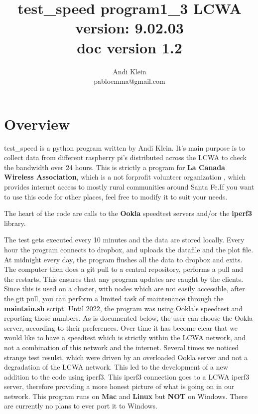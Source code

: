 \documentclass[11pt]{article}
\begin{document}
\author{ Andi Klein \\ pabloemma@gmail.com}
\title{ test\_speed program1\_3 LCWA \\ 
		\bf{version: 9.02.03} \\
		doc version 1.2}
\maketitle
\setcounter{secnumdepth}{10}
\setcounter{tocdepth}{10}

\tableofcontents
\newpage

\newenvironment{andilist}{\begin{itemize} \em}{\end{itemize}}



\section{Overview}
test\_speed is a python program written by Andi Klein. It's main purpose is to collect data from different raspberry pi's distributed across the LCWA to check the bandwidth over 24 hours. This is strictly a program for \textbf{La Canada Wireless Association}, which is a not forprofit volunteer organization , which provides internet access to mostly rural communities around Santa Fe.If you want to use this code for other places, feel free to modify it to suit your needs.

The heart of the code are calls to the \textbf{Ookla} speedtest servers and/or the \textbf{iperf3} library. 

The test gets executed every 10 minutes and the data are stored locally. Every hour the program connects to dropbox, and uploads the datafile and the plot file. At midnight every day, the program flushes all the data to dropbox and exits. The computer then does a git pull to a central repository, performs a pull and the restarts. This ensures that any program updates are caught by the clients. Since this is used on a cluster, with nodes which are not easily accessible, after the git pull, you can perform a limited task of maintenance through the {\bf maintain.sh} script.
Until 2022, the program was using Ookla's speedtest and reporting those numbers. As is documented below, the user can choose the Ookla server, according to their preferences. Over time it has become clear that we would like to have a speedtest which is strictly within the LCWA network, and not a combination of this network and the internet. Several times we noticed strange test resulst, which were driven by an overloaded Ookla server and not a degradation of the LCWA network. This led to the development of a new addition to the code using iperf3. This iperf3 connection goes to a LCWA iperf3 server, therefore providing a more honest picture of what is going on in our network. This program runs on \textbf{Mac} and \textbf{Linux} but \textbf{NOT} on Windows. There are currently no plans to ever port it to Windows.
\end{document}
